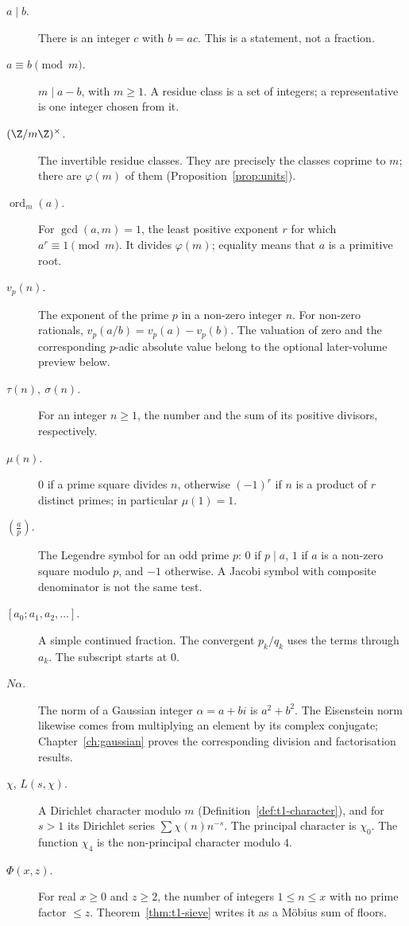 \begin{description}
\item[$a\mid b$.] There is an integer $c$ with $b=ac$. This is a statement, not a fraction.
\item[$a\equiv b\pmod m$.] $m\mid a-b$, with $m\ge1$. A residue class is a set of integers; a representative is
one integer chosen from it.
\item[$(\Z/m\Z)^\times$.] The invertible residue classes. They are precisely the classes coprime to $m$;
there are $\varphi(m)$ of them (Proposition~\ref{prop:units}).
\item[$\operatorname{ord}_m(a)$.] For $\gcd(a,m)=1$, the least positive exponent $r$ for which
$a^r\equiv1\pmod m$. It divides $\varphi(m)$; equality means that $a$ is a primitive root.
\item[$v_p(n)$.] The exponent of the prime $p$ in a non-zero integer $n$. For non-zero rationals,
$v_p(a/b)=v_p(a)-v_p(b)$. The valuation of zero and the corresponding $p$-adic absolute value belong to the optional later-volume preview below.
\item[$\tau(n),\ \sigma(n)$.] For an integer $n\ge1$, the number and the sum of its positive divisors, respectively.
\item[$\mu(n)$.] $0$ if a prime square divides $n$, otherwise $(-1)^r$ if $n$ is a product of $r$ distinct
primes; in particular $\mu(1)=1$.
\item[$\left(\frac ap\right)$.] The Legendre symbol for an odd prime $p$: $0$ if $p\mid a$, $1$ if $a$ is a
non-zero square modulo $p$, and $-1$ otherwise. A Jacobi symbol with composite denominator is not the same test.
\item[{$[a_0;a_1,a_2,\ldots]$.}] A simple continued fraction. The convergent $p_k/q_k$ uses the terms through
$a_k$. The subscript starts at $0$.
\item[$N\alpha$.] The norm of a Gaussian integer $\alpha=a+bi$ is
$a^2+b^2$. The Eisenstein norm likewise comes from multiplying an element
by its complex conjugate; Chapter~\ref{ch:gaussian} proves the corresponding
division and factorisation results.
\item[$\chi$, $L(s,\chi)$.] A Dirichlet character modulo $m$ (Definition~\ref{def:t1-character}), and for $s>1$ its Dirichlet series $\sum\chi(n)n^{-s}$. The principal character is $\chi_0$. The function $\chi_4$ is the non-principal character modulo $4$.
\item[$\Phi(x,z)$.] For real $x\ge0$ and $z\ge2$, the number of integers $1\le n\le x$ with no prime factor $\le z$. Theorem~\ref{thm:t1-sieve} writes it as a M\"obius sum of floors.
\end{description}

